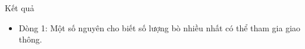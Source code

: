 Kết quả
\begin{itemize}
	\item     Dòng 1: Một số nguyên cho biết số lượng bò nhiều nhất có thể            tham gia giao thông.   
\end{itemize}